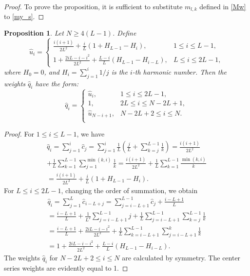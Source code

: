 \documentclass[sii]{ipart}
\newtheorem{proposition}{Proposition}
\begin{document}
\begin{proof}
	To prove the proposition, it is sufficient to substitute $m_{l,k}$ defined in \eqref{Mw} to \eqref{my_s}.
\end{proof}

\begin{proposition} \label{myserweightstat}
	Let $N \ge 4(L-1)$. Define
	\begin{equation*}
	\hat{u}_i = \begin{cases}
	\frac{i(i+1)}{2 L^2} + \frac{i}{L}(1 + H_{L-1} - H_i), &1 \le i \le L-1, \\
	1 + \frac{2iL-i-i^2}{2L^2} + \frac{L-i}{L}(H_{L-1} - H_{i - L}), & L \le i \le 2L-1,
	\end{cases}
	\end{equation*}
	where $H_0 = 0$, and $H_i = \sum_{j=1}^i 1/j$ is the $i$-th harmonic number.
	 Then the weights $\hat{q}_i$ have the form:
	\begin{equation*}
	\hat{q}_i = \begin{cases}
	\hat{u}_i, &1 \le i \le 2L-1, \\
		1, &2L \le i \le N-2L+1,\\
\hat{u}_{N-i+1}, &N-2L+2 \le i \le N. \\
	\end{cases}
	\end{equation*}
\end{proposition}

\begin{proof}
	For $1 \le i \le L-1$, we have
	\begin{multline*}
	\hat{q}_i = \sum_{j=1}^i \hat{c}_j = \sum_{j=1}^i \frac{1}{L}\left(\frac{j}{L} + \sum_{k=j}^{L-1}\frac{1}{k}\right)\! =
	\frac{i(i+1)}{2L^2} \\ + \frac{1}{L} \sum_{k = 1}^{L-1} \sum_{j=1}^{\min(k,i)} \frac{1}{k} = \frac{i(i+1)}{2L^2}+\frac{1}{L} \sum_{k = 1}^{L-1} \frac{\min(k,i)}{k} \\ = \frac{i(i+1)}{2 L^2} + \frac{i}{L}(1 + H_{L-1} - H_i).
	\end{multline*}
	For $L \le i \le 2L-1$, changing the order of summation, we obtain
	\begin{multline*}
	\hat{q}_i = \sum_{j = 1}^L \hat{c}_{i-L+j} = \sum_{j = i - L + 1}^{L - 1} \hat{c}_j + \frac{i - L + 1}{L} \\
	=\frac{i - L + 1}{L} + \frac{1}{L^2} \sum_{j = i - L + 1}^{L-1}j + \frac{1}{L} \sum_{j = i-L + 1}^{L-1} \sum_{k=j}^{L-1}\frac{1}{k} \\
	=\frac{i - L + 1}{L} + \frac{2iL - i - i^2}{2L^2} + \frac{1}{L} \sum_{k = i - L + 1}^{L - 1} \sum_{j = i - L + 1}^k \frac{1}{k} \\
	=1 + \frac{2iL-i-i^2}{2L^2} + \frac{L-i}{L}(H_{L-1} - H_{i - L}).
	\end{multline*}
	The weights $\hat{q}_i$ for $N-2L+2 \le i \le N$ are calculated by symmetry. The center series weights are evidently equal to 1.
\end{proof}
\end{document}
